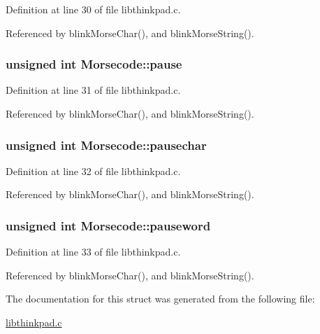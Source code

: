 Definition at line 30 of file libthinkpad.c.

Referenced by blinkMorseChar(), and blinkMorseString().\hypertarget{structMorsecode_ab2bdcbe47e1574b123de1b446cb5437}{
\subsubsection{\setlength{\rightskip}{0pt plus 5cm}unsigned int {\bf Morsecode::pause}}}
\label{structMorsecode_ab2bdcbe47e1574b123de1b446cb5437}




Definition at line 31 of file libthinkpad.c.

Referenced by blinkMorseChar(), and blinkMorseString().\hypertarget{structMorsecode_e2cd11cab14de8e29d67bcd8557e9e56}{
\subsubsection{\setlength{\rightskip}{0pt plus 5cm}unsigned int {\bf Morsecode::pausechar}}}
\label{structMorsecode_e2cd11cab14de8e29d67bcd8557e9e56}




Definition at line 32 of file libthinkpad.c.

Referenced by blinkMorseChar(), and blinkMorseString().\hypertarget{structMorsecode_b8003369db1fa07cff2ccfcd2928104e}{
\subsubsection{\setlength{\rightskip}{0pt plus 5cm}unsigned int {\bf Morsecode::pauseword}}}
\label{structMorsecode_b8003369db1fa07cff2ccfcd2928104e}




Definition at line 33 of file libthinkpad.c.

Referenced by blinkMorseChar(), and blinkMorseString().

The documentation for this struct was generated from the following file:\begin{CompactItemize}
\item 
\hyperlink{libthinkpad_8c}{libthinkpad.c}\end{CompactItemize}
